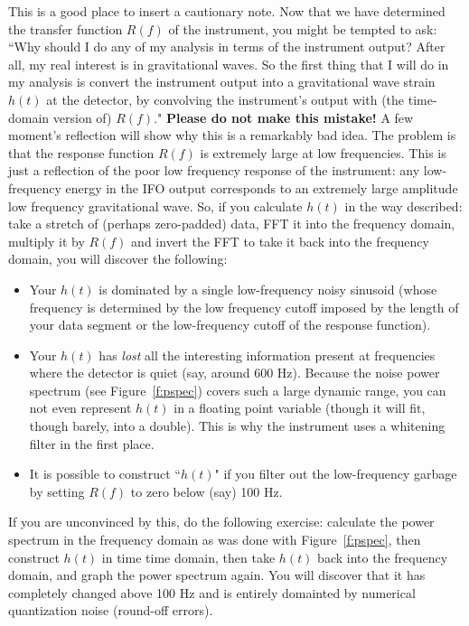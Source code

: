 This is a good place to insert a cautionary note.  Now that we have
determined the transfer function $R(f)$ of the instrument, you might be
tempted to ask: ``Why should I do any of my analysis in terms of the
instrument output?  After all, my real interest is in gravitational
waves.  So the first thing that I will do in my analysis is convert the
instrument output into a gravitational wave strain $h(t)$ at the
detector, by convolving the instrument's output with (the time-domain
version of) $R(f)$."  {\bf Please do not make this mistake!} A few moment's
reflection will show why this is a remarkably bad idea.  The problem
is that the response function $R(f)$ is extremely
large at low frequencies.  This is just a reflection of the poor low
frequency response of the instrument: any low-frequency energy in the
IFO output corresponds to an extremely large amplitude low frequency
gravitational wave.  So, if you calculate $h(t)$ in the way described:
take a stretch of (perhaps zero-padded) data, FFT it into the frequency domain,
multiply it by $R(f)$ and invert the FFT to take it back into the frequency
domain, you will discover the following:
\begin{itemize}
\item
Your $h(t)$ is dominated by a single low-frequency noisy sinusoid
(whose frequency is determined by the low frequency cutoff imposed by
the length of your data segment or the low-frequency cutoff of the
response function).
\item
Your $h(t)$ has {\it lost} all the interesting information present at
frequencies where the detector is quiet (say, around 600 Hz).  Because
the noise power spectrum (see Figure~\ref{f:pspec}) covers such a large
dynamic range, you can not even represent $h(t)$ in a floating point
variable (though it will fit, though barely, into a double).  This is
why the instrument uses a whitening filter in the first place.
\item
It is possible to construct ``$h(t)$" if you filter out the
low-frequency garbage by setting $R(f)$ to zero below (say) 100 Hz.
\end{itemize}
If you are unconvinced by this, do the following exercise:  calculate
the power spectrum in the frequency domain as was done with
Figure~\ref{f:pspec}, then construct $h(t)$ in time time domain, then
take $h(t)$ back into the frequency domain, and graph the power
spectrum again.  You will discover that it has completely changed above
100 Hz and is entirely domainted by numerical quantization noise
(round-off errors).

